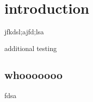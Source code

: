 \documentclass{mitthesis}
\begin{document}
\chapter{introduction}

jfkdsl;ajfd;lsa

additional testing

\section{whooooooo}
fdsa
\end{document}
